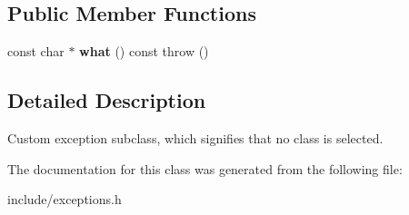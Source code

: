 \subsection*{Public Member Functions}
\begin{DoxyCompactItemize}
\item 
\mbox{\label{classClassNotSelectedError_a173abddcbffb076d1936b61db9ad46e8}} 
const char $\ast$ {\bfseries what} () const  throw ()
\end{DoxyCompactItemize}


\subsection{Detailed Description}
Custom exception subclass, which signifies that no class is selected. 

The documentation for this class was generated from the following file\+:\begin{DoxyCompactItemize}
\item 
include/exceptions.\+h\end{DoxyCompactItemize}

